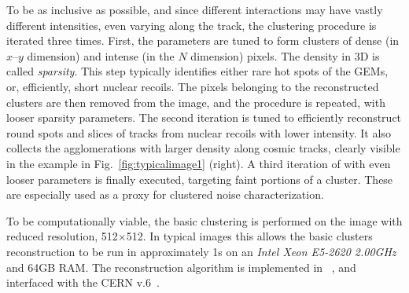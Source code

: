 To be as inclusive as possible, and since different interactions may
have vastly different intensities, even varying along the track, the
clustering procedure is iterated three times.  First, the \dbscan
parameters are tuned to form clusters of dense (in $x$--$y$ dimension)
and intense (in the $N$ dimension) pixels. The density in 3D is
called \textit{sparsity}.  This step typically identifies either rare
hot spots of the GEMs, or, efficiently, short nuclear recoils. The
pixels belonging to the reconstructed clusters are then removed from
the image, and the \dbscan procedure is repeated, with looser sparsity
parameters. The second iteration is tuned to efficiently reconstruct
\fe round spots and slices of tracks from nuclear recoils with lower
intensity. It also collects the agglomerations with larger density
along cosmic tracks, clearly visible in the example in
Fig.~\ref{fig:typicalimage1} (right).  A third iteration of \dbscan
with even looser parameters is finally executed, targeting faint
portions of a cluster. These are especially used as a proxy for
clustered noise characterization.

To be computationally viable, the \idbscan basic clustering is
performed on the image with reduced resolution, 512$\times$512. In
typical images this allows the basic clusters reconstruction to be run
in approximately 1\unit{s} on an \textit{Intel Xeon E5-2620
2.00\unit{GHz}} and 64\unit{GB} RAM. The reconstruction algorithm is
implemented in \PYTHONthree~\cite{python3}, and interfaced with the
CERN \ROOT v.6~\cite{root}.

